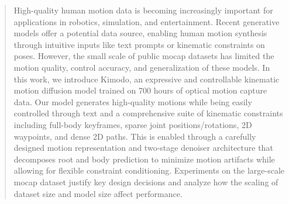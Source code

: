 
\begin{abstract} 
High-quality human motion data is becoming increasingly important for applications in robotics, simulation, and entertainment. Recent generative models offer a potential data source, enabling human motion synthesis through intuitive inputs like text prompts or kinematic constraints on poses. However, the small scale of public mocap datasets has limited the motion quality, control accuracy, and generalization of these models. In this work, we introduce Kimodo, an expressive and controllable kinematic motion diffusion model trained on 700 hours of optical motion capture data. Our model generates high-quality motions while being easily controlled through text and a comprehensive suite of kinematic constraints including full-body keyframes, sparse joint positions/rotations, 2D waypoints, and dense 2D paths. This is enabled through a carefully designed motion representation and two-stage denoiser architecture that decomposes root and body prediction to minimize motion artifacts while allowing for flexible constraint conditioning. Experiments on the large-scale mocap dataset justify key design decisions and analyze how the scaling of dataset size and model size affect performance.
\end{abstract}
